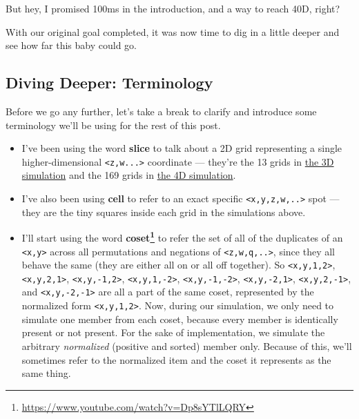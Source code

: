 \documentclass[]{article}
\renewcommand{\href}[2]{#2\footnote{\url{#1}}}
\begin{document}
But hey, I promised 100ms in the introduction, and a way to reach 40D, right?

With our original goal completed, it was now time to dig in a little deeper and
see how far this baby could go.

\hypertarget{diving-deeper-terminology}{%
\subsection{Diving Deeper: Terminology}\label{diving-deeper-terminology}}

Before we go any further, let's take a break to clarify and introduce some
terminology we'll be using for the rest of this post.

\begin{itemize}
\item
  I've been using the word \textbf{slice} to talk about a 2D grid representing a
  single higher-dimensional \texttt{\textless{}z,w...\textgreater{}} coordinate
  --- they're the 13 grids in \protect\hyperlink{gol3D}{the 3D simulation} and
  the 169 grids in \protect\hyperlink{gol4D}{the 4D simulation}.
\item
  I've also been using \textbf{cell} to refer to an exact specific
  \texttt{\textless{}x,y,z,w,..\textgreater{}} spot --- they are the tiny
  squares inside each grid in the simulations above.
\item
  I'll start using the word
  \textbf{\href{https://www.youtube.com/watch?v=Dp8sYTlLQRY}{coset}} to refer
  the set of all of the duplicates of an \texttt{\textless{}x,y\textgreater{}}
  across all permutations and negations of
  \texttt{\textless{}z,w,q,..\textgreater{}}, since they all behave the same
  (they are either all on or all off together). So
  \texttt{\textless{}x,y,1,2\textgreater{}},
  \texttt{\textless{}x,y,2,1\textgreater{}},
  \texttt{\textless{}x,y,-1,2\textgreater{}},
  \texttt{\textless{}x,y,1,-2\textgreater{}},
  \texttt{\textless{}x,y,-1,-2\textgreater{}},
  \texttt{\textless{}x,y,-2,1\textgreater{}},
  \texttt{\textless{}x,y,2,-1\textgreater{}}, and
  \texttt{\textless{}x,y,-2,-1\textgreater{}} are all a part of the same coset,
  represented by the normalized form \texttt{\textless{}x,y,1,2\textgreater{}}.
  Now, during our simulation, we only need to simulate one member from each
  coset, because every member is identically present or not present. For the
  sake of implementation, we simulate the arbitrary \emph{normalized} (positive
  and sorted) member only. Because of this, we'll sometimes refer to the
  normalized item and the coset it represents as the same thing.

\end{itemize}
\end{document}
